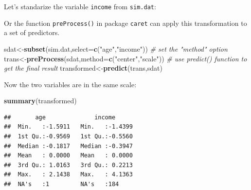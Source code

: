 \documentclass[]{book}
\newenvironment{Shaded}{\begin{snugshade}}{\end{snugshade}}
\newcommand{\KeywordTok}[1]{\textcolor[rgb]{0.13,0.29,0.53}{\textbf{{#1}}}}
\newcommand{\DataTypeTok}[1]{\textcolor[rgb]{0.13,0.29,0.53}{{#1}}}
\newcommand{\StringTok}[1]{\textcolor[rgb]{0.31,0.60,0.02}{{#1}}}
\newcommand{\CommentTok}[1]{\textcolor[rgb]{0.56,0.35,0.01}{\textit{{#1}}}}
\newcommand{\NormalTok}[1]{{#1}}
\theoremstyle{definition}
\theoremstyle{definition}
\theoremstyle{remark}
\begin{document}
Let's standarize the variable \texttt{income} from \texttt{sim.dat}:

\begin{Shaded}
\end{Shaded}

Or the function \texttt{preProcess()} in package \texttt{caret} can
apply this transformation to a set of predictors.

\begin{Shaded}
\begin{Highlighting}[]
\NormalTok{sdat<-}\KeywordTok{subset}\NormalTok{(sim.dat,}\DataTypeTok{select=}\KeywordTok{c}\NormalTok{(}\StringTok{"age"}\NormalTok{,}\StringTok{"income"}\NormalTok{))}
\CommentTok{# set the "method" option}
\NormalTok{trans<-}\KeywordTok{preProcess}\NormalTok{(sdat,}\DataTypeTok{method=}\KeywordTok{c}\NormalTok{(}\StringTok{"center"}\NormalTok{,}\StringTok{"scale"}\NormalTok{))}
\CommentTok{# use predict() function to get the final result}
\NormalTok{transformed<-}\KeywordTok{predict}\NormalTok{(trans,sdat)}
\end{Highlighting}
\end{Shaded}

Now the two variables are in the same scale:

\begin{Shaded}
\begin{Highlighting}[]
\KeywordTok{summary}\NormalTok{(transformed)}
\end{Highlighting}
\end{Shaded}

\begin{verbatim}
##       age              income       
##  Min.   :-1.5911   Min.   :-1.4399  
##  1st Qu.:-0.9569   1st Qu.:-0.5560  
##  Median :-0.1817   Median :-0.3947  
##  Mean   : 0.0000   Mean   : 0.0000  
##  3rd Qu.: 1.0163   3rd Qu.: 0.2213  
##  Max.   : 2.1438   Max.   : 4.1363  
##  NA's   :1         NA's   :184
\end{verbatim}
\end{document}
